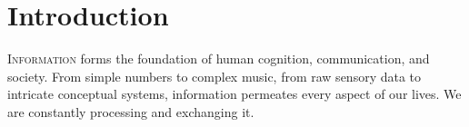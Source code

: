 \chapter{Introduction}
\label{chp:intro}












\lettrine{I}{nformation} forms the foundation of human cognition, communication, and society.
From simple numbers to complex music, from raw sensory data to intricate conceptual systems, information permeates every aspect of our lives.
We are constantly processing and exchanging it.

